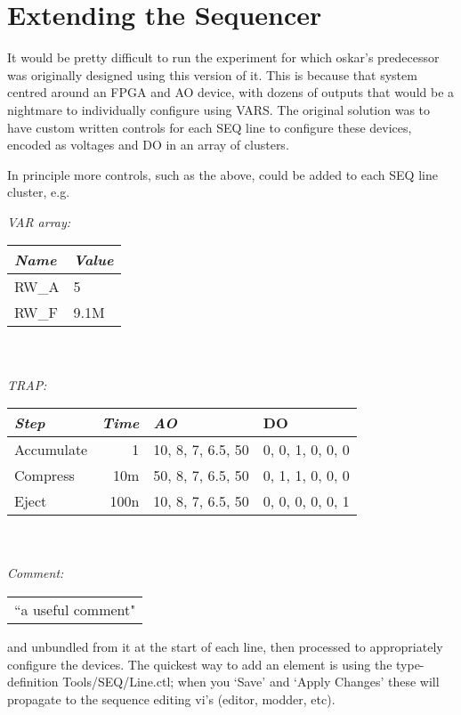 \documentclass[10pt,a4paper]{article}
\begin{document}
\section{\label{sex:ext}Extending the Sequencer}

It would be pretty difficult to run the experiment for which oskar's predecessor was originally designed using this version of it.  This is because that system centred around an FPGA and AO device, with dozens of outputs that would be a nightmare to individually configure using VARS.  The original solution was to have custom written controls for each SEQ line to configure these devices, encoded as voltages and DO in an array of clusters.

In principle more controls, such as the above, could be added to each SEQ line cluster, e.g.

\hangindent=0.7cm
\emph{VAR array:} \\
\begin{tabularx}{0.3\textwidth}{X|X}
	\emph{Name} & \emph{Value} \\ \hline
	RW\_A & 5 \\
	RW\_F & 9.1M \\
\end{tabularx} \\ \vspace{3mm} \\
\emph{TRAP:} \\
\begin{tabularx}{0.85\textwidth}{X|r|X|X}
	\emph{Step} & \emph{Time} & \emph{AO} & DO \\ \hline
	Accumulate & 1 & 10, 8, 7, 6.5, 50 & 0, 0, 1, 0, 0, 0 \\
	Compress & 10m & 50, 8, 7, 6.5, 50 & 0, 1, 1, 0, 0, 0 \\
	Eject & 100n & 10, 8, 7, 6.5, 50 & 0, 0, 0, 0, 0, 1 \\
\end{tabularx} \\ \vspace{3mm} \\
\emph{Comment:} \\
\begin{tabularx}{0.85\textwidth}{l}
	``a useful comment"
\end{tabularx}
\vspace{2mm}

\noindent and unbundled from it at the start of each line, then processed to appropriately configure the devices.  The quickest way to add an element is using the type-definition Tools/SEQ/Line.ctl; when you `Save' and `Apply Changes' these will propagate to the sequence editing vi's (editor, modder, etc).
\end{document}
